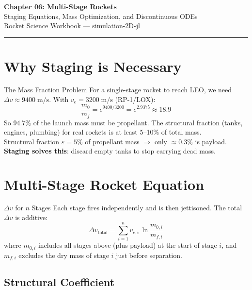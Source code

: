 \documentclass[12pt, a4paper]{article}
\begin{document}
\begin{center}
  {\LARGE \textbf{Chapter 06: Multi-Stage Rockets}}\\[0.5em]
  {\large \textcolor{hintgray}{Staging Equations, Mass Optimization, and Discontinuous ODEs}}\\[0.3em]
  {\small \textcolor{hintgray}{Rocket Science Workbook — simulation-2D-jl}}
\end{center}
\vspace{1em}\hrule\vspace{1.5em}

\section{Why Staging is Necessary}

\begin{theorybox}{The Mass Fraction Problem}
For a single-stage rocket to reach LEO, we need $\Delta v \approx 9400\;\text{m/s}$.
With $v_e = 3200\;\text{m/s}$ (RP-1/LOX):
\[
  \frac{m_0}{m_f} = e^{9400/3200} = e^{2.9375} \approx 18.9
\]
So 94.7\% of the launch mass must be propellant. The structural fraction (tanks, engines, plumbing) for real rockets is at least 5–10\% of total mass.\\[0.4em]
Structural fraction $\varepsilon = 5\%$ of propellant mass $\Rightarrow$ only $\approx 0.3\%$ is payload.\\[0.4em]
\textbf{Staging solves this}: discard empty tanks to stop carrying dead mass.
\end{theorybox}

\section{Multi-Stage Rocket Equation}

\begin{theorybox}{$\Delta v$ for $n$ Stages}
Each stage fires independently and is then jettisoned. The total $\Delta v$ is additive:
\[
  \Delta v_\text{total} = \sum_{i=1}^n v_{e,i}\,\ln\frac{m_{0,i}}{m_{f,i}}
\]
where $m_{0,i}$ includes all stages above (plus payload) at the start of stage $i$,
and $m_{f,i}$ excludes the dry mass of stage $i$ just before separation.
\end{theorybox}

\subsection*{Structural Coefficient}
\end{document}
